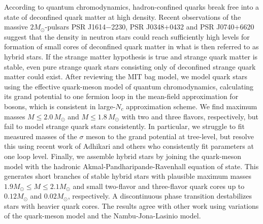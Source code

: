 According to quantum chromodynamics,
hadron-confined quarks break free into a state of deconfined quark matter at high density.
Recent observations of the massive $2 M_\odot$-pulsars PSR J1614$-$2230, PSR J0348$+$0432 and PSR J0740$+$6620
suggest that the density in neutron stars could reach sufficiently high levels
for formation of small cores of deconfined quark matter in what is then referred to as hybrid stars.
If the strange matter hypothesis is true and strange quark matter is stable,
even pure strange quark stars consisting only of deconfined strange quark matter could exist.
After reviewing the MIT bag model,
we model quark stars using the effective quark-meson model of quantum chromodynamics,
calculating its grand potential to one fermion loop in the mean-field approximation for bosons,
which is consistent in large-$N_c$ approximation scheme.
We find maximum masses $M \leq 2.0 \, M_\odot$ and $M \leq 1.8 \, M_\odot$ with two and three flavors, respectively,
but fail to model strange quark stars consistently.
In particular, we struggle to fit measured masses 
of the $\sigma$ meson to the grand potential at tree-level,
but resolve this using recent work of Adhikari and others who consistently fit parameters at one loop level.
Finally, we assemble hybrid stars by joining the quark-meson model with the hadronic Akmal-Pandharipande-Ravenhall equation of state.
This generates short branches of stable hybrid stars with plausible maximum masses $1.9 M_\odot \leq M \leq 2.1 M_\odot$
and small two-flavor and three-flavor quark cores up to $0.12 M_\odot$ and $0.02 M_\odot$, respectively.
A discontinuous phase transition destabilizes stars with heavier quark cores.
The results agree with other work using variations of the quark-meson model and the Nambu-Jona-Lasinio model.%
\tikzexternaldisable%
%
\tikzexternalenable%
